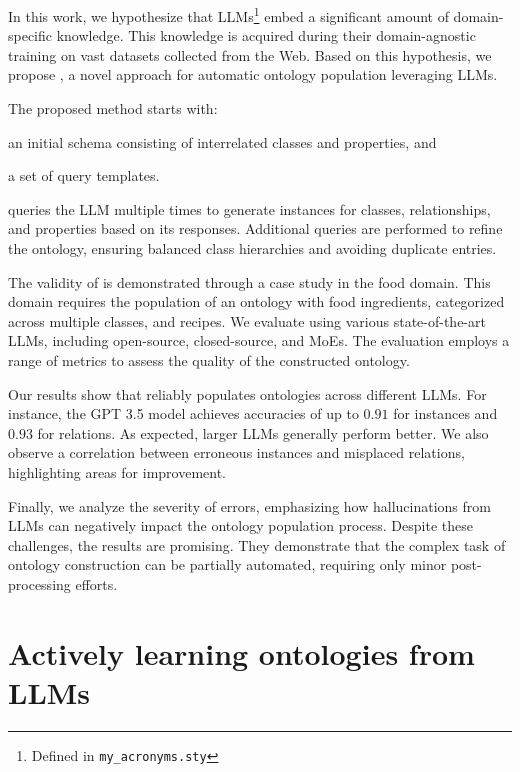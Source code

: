 In this work, we hypothesize that \glspl{LLM}\footnote{Defined in \texttt{my\_acronyms.sty}} embed a significant amount of domain-specific knowledge.
%
This knowledge is acquired during their domain-agnostic training on vast datasets collected from the Web.
%
Based on this hypothesis, we propose \llmfkg{}, a novel approach for automatic ontology population leveraging \glspl{LLM}.
%

The proposed method starts with:
%
\begin{inlinelist}
    \item an initial schema consisting of interrelated classes and properties, and
    \item a set of query templates.
\end{inlinelist}
%
\llmfkg{} queries the \gls{LLM} multiple times to generate instances for classes, relationships, and properties based on its responses.
%
Additional queries are performed to refine the ontology, ensuring balanced class hierarchies and avoiding duplicate entries.
%

The validity of \llmfkg{} is demonstrated through a case study in the food domain.
%
This domain requires the population of an ontology with food ingredients, categorized across multiple classes, and recipes.
%
We evaluate \llmfkg{} using various state-of-the-art \glspl{LLM}, including open-source, closed-source, and \glspl{MoE}.
%
The evaluation employs a range of metrics to assess the quality of the constructed ontology.
%

Our results show that \llmfkg{} reliably populates ontologies across different \glspl{LLM}.
%
For instance, the GPT 3.5 model achieves accuracies of up to \(0.91\) for instances and \(0.93\) for relations.
%
As expected, larger \glspl{LLM} generally perform better.
%
We also observe a correlation between erroneous instances and misplaced relations, highlighting areas for improvement.
%

Finally, we analyze the severity of errors, emphasizing how hallucinations from \glspl{LLM} can negatively impact the ontology population process.
%
Despite these challenges, the results are promising.
%
They demonstrate that the complex task of ontology construction can be partially automated, requiring only minor post-processing efforts.
%




\section{Actively learning ontologies from \glspl{LLM}}\label{sec:actively-learning-ontologies}
